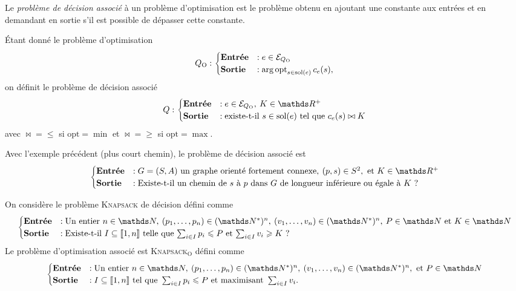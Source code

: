 \begin{defn}
	Le \textit{problème de décision associé} à un problème d'$\mathrm{opt}$imisation est le problème obtenu en ajoutant une constante aux entrées et en demandant en sortie s'il est possible de dépasser cette constante.
\end{defn}

\begin{exm}
	Étant donné le problème d'$\mathrm{opt}$imisation \[
		Q_\mathrm{O} : \begin{cases}
			\text{\textbf{Entrée}} &: e \in \mathcal{E}_{Q_\mathrm{O}}\\
			\text{\textbf{Sortie}} &: \mathop{\mathrm{arg\,opt}}_{s \in \mathrm{sol}(e)} c_e(s),
		\end{cases}
	\]
	on définit le problème de décision associé
	\[
		Q : \begin{cases}
			\text{\textbf{Entrée}} &: e \in \mathcal{E}_{Q_\mathrm{O}},\: K \in \R^+\\
			\text{\textbf{Sortie}} &: \text{existe-t-il } s \in \mathrm{sol}(e) \text{ tel que } c_e(s) \mathrel{\bowtie} K
		\end{cases}
	\] avec ${\bowtie} = {\le}$\/ si $\mathrm{opt} = {\min}$ et ${\bowtie} = {\ge}$\/ si $\mathrm{opt} = {\max}$.
\end{exm}

\begin{exm}
	Avec l'exemple précédent (plus court chemin), le problème de décision associé est \[
		\begin{cases}
			\text{\textbf{Entrée}} &: G = (S, A) \text{ un graphe orienté fortement connexe},\: (p, s) \in S^2, \text{ et } K \in \R^+\\
			\text{\textbf{Sortie}} &: \text{Existe-t-il un chemin de $s$\/ à $p$\/ dans $G$\/ de longueur inférieure ou égale à $K$\/ ?}
		\end{cases}
	\]
\end{exm}

\begin{exm}
	On considère le problème \textsc{Knapsack} de décision défini comme \[
		\begin{cases}
			\text{\textbf{Entrée}} &: \text{Un entier } n \in \N,\:(p_1, \ldots, p_n) \in (\N^*)^n,\:(v_1, \ldots, v_n) \in (\N^*)^n,\: P \in \N \text{ et } K \in \N\\
			\text{\textbf{Sortie}} &: \text{Existe-t-il $I \subseteq \llbracket 1,n \rrbracket$\/ telle que $\sum_{i \in I} p_i \le P$\/ et $\sum_{i \in I} v_i \ge K$\/ ?}
		\end{cases}
	\] Le problème d'$\mathrm{opt}$imisation associé est \textsc{Knapsack}$_\mathrm{O}$ défini comme \[
		\begin{cases}
			\text{\textbf{Entrée}} &: \text{Un entier } n \in \N,\:(p_1, \ldots, p_n) \in (\N^*)^n,\:(v_1, \ldots, v_n) \in (\N^*)^n, \text{ et }P \in \N\\
			\text{\textbf{Sortie}} &: I \subseteq \llbracket 1,n \rrbracket \text{ tel que } \sum_{i \in I} p_i \le P \text{ et maximisant } \sum_{i \in I} v_i.
		\end{cases}
	\]
\end{exm}


